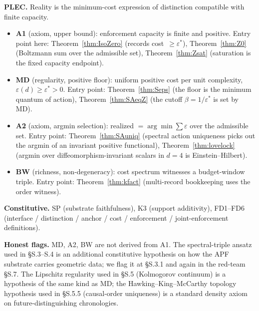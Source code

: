 \documentclass[11pt,a4paper]{article}
\theoremstyle{definition}
\newcommand{\eps}{\varepsilon}
\newcommand{\epsstar}{\varepsilon^{\ast}}
\newcommand{\Ctot}{C_{\mathrm{total}}}
\newcommand{\deff}{d_{\mathrm{eff}}}
\begin{document}
\begin{abstract}
\textbf{Scope.} All proofs use only A1, MD, A2, BW, the constitutive semantics SP and K3, and derived results of Papers~1--5 (finite-dimensional substrate, capacity partition $\Ctot=61$ with $\deff=102$, and the emergent Hilbert space). Where an additional assumption is needed (spectral-triple ansatz, Lipschitz regularity, causal-order topology) it is flagged at point of use and repeated in the closing red-team audit (§S.7).
\end{abstract}

\medskip

\begin{tcolorbox}[apfbox, title={PLEC: four structurally necessary components}]
\footnotesize
\textbf{PLEC.} Reality is the minimum-cost expression of distinction compatible with finite capacity.
\begin{itemize}[leftmargin=*,nosep]
\item \textbf{A1} (axiom, upper bound): enforcement capacity is finite and positive.  Entry point here: Theorem~\ref{thm:IsoZero} (records cost~$\geq\epsstar$), Theorem~\ref{thm:Z0} (Boltzmann sum over the admissible set), Theorem~\ref{thm:Zsat} (saturation is the fixed capacity endpoint).
\item \textbf{MD} (regularity, positive floor): uniform positive cost per unit complexity, $\eps(d)\geq \epsstar>0$.  Entry point: Theorem~\ref{thm:Seps} (the floor is the minimum quantum of action), Theorem~\ref{thm:SAeqZ} (the cutoff $\beta=1/\epsstar$ is set by MD).
\item \textbf{A2} (axiom, argmin selection): realized $=\arg\min\sum\eps$ over the admissible set.  Entry point: Theorem~\ref{thm:SAuniq} (spectral action uniqueness picks out the argmin of an invariant positive functional), Theorem~\ref{thm:lovelock} (argmin over diffeomorphism-invariant scalars in $d=4$ is Einstein--Hilbert).
\item \textbf{BW} (richness, non-degeneracy): cost spectrum witnesses a budget-window triple.  Entry point: Theorem~\ref{thm:kfact} (multi-record bookkeeping uses the order witness).
\end{itemize}

\textbf{Constitutive.} SP (substrate faithfulness), K3 (support additivity), FD1--FD6 (interface / distinction / anchor / cost / enforcement / joint-enforcement definitions).

\textbf{Honest flags.}  MD, A2, BW are not derived from A1.  The spectral-triple ansatz used in §S.3--S.4 is an additional constitutive hypothesis on how the APF substrate carries geometric data; we flag it at §S.3.1 and again in the red-team §S.7.  The Lipschitz regularity used in §S.5 (Kolmogorov continuum) is a hypothesis of the same kind as MD; the Hawking--King--McCarthy topology hypothesis used in §S.5.5 (causal-order uniqueness) is a standard density axiom on future-distinguishing chronologies.
\end{tcolorbox}
\end{document}
